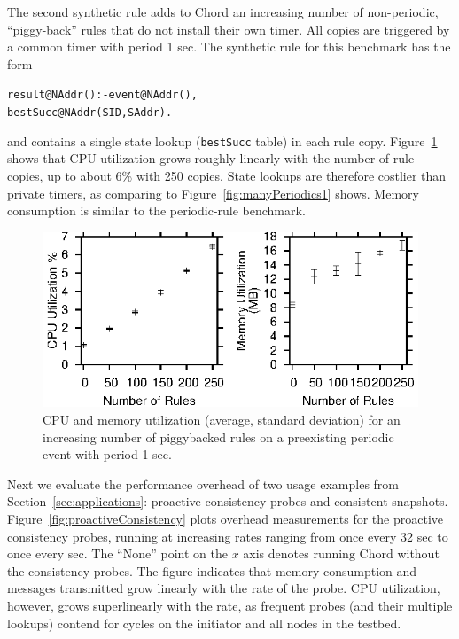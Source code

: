 \documentclass{sig-alt-full}
\newenvironment{overlog}{\begin{alltt}\footnotesize}{\end{alltt}}
\newcommand{\ol}[1]{{\tt\footnotesize#1}}
\begin{document}
The second synthetic rule adds to Chord an increasing number of
non-periodic, ``piggy-back'' rules that do not install their own timer.
All copies are triggered by a common timer with period 1 sec. The
synthetic rule for this benchmark has the form
\begin{overlog}
result@NAddr() :- event@NAddr(),
   bestSucc@NAddr(SID, SAddr).
\end{overlog}
and contains a single state
lookup (\ol{bestSucc} table) in each rule copy.
Figure~\ref{fig:manyJoins1} shows that CPU utilization grows roughly
linearly with the number of rule copies, up to about 6\% with 250
copies.  State lookups are therefore costlier than private timers, as
comparing to Figure~\ref{fig:manyPeriodics1} shows.  Memory consumption
is similar to the periodic-rule benchmark.

\begin{figure}
\centerline{\includegraphics{newResults/manyJoins1}}
\caption{CPU and memory utilization (average, standard deviation) for
  an increasing number of piggybacked rules on a preexisting
  periodic event with period 1 sec.}
\label{fig:manyJoins1}
\end{figure}


Next we evaluate the performance overhead of two usage examples from
Section~\ref{sec:applications}: proactive consistency probes and consistent
snapshots.
Figure~\ref{fig:proactiveConsistency} plots overhead measurements for
the proactive consistency probes, running at increasing rates ranging
from once every 32 sec to once every sec.  The ``None'' point on the $x$
axis denotes running Chord without the consistency probes.  The figure
indicates that memory consumption and messages transmitted grow linearly
with the rate of the probe.  CPU utilization, however, grows
superlinearly with the rate, as frequent probes (and their multiple
lookups) contend for cycles on the initiator and all nodes in the
testbed. 
\end{document}
